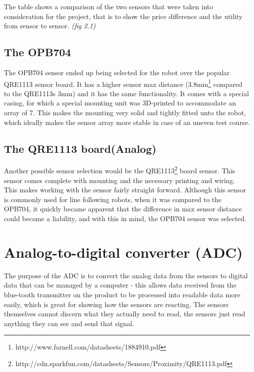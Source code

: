 The table shows a comparison of the two sensors that were taken into consideration for the project, that is to show the price difference and the utility from sensor to sensor. \emph{(fig 2.1)}



\subsection{The OPB704}

The OPB704 sensor ended up being selected for the robot over the popular QRE1113 sensor board. It has a higher sensor max distance (3.8mm\footnote{http://www.farnell.com/datasheets/1884910.pdf} compared to the QRE1113s 3mm) and it has the same functionality. It comes with a special casing, for which a special mounting unit was 3D-printed to accommodate an array of 7. This makes the mounting very solid and tightly fitted unto the robot, which ideally makes the sensor array more stable in case of an uneven test course.


\subsection{The QRE1113 board(Analog)}

Another possible sensor selection would be the QRE1113\footnote{http://cdn.sparkfun.com/datasheets/Sensors/Proximity/QRE1113.pdf} board sensor. This sensor comes complete with mounting and the necessary printing and wiring. This makes working with the sensor fairly straight forward. Although this sensor is commonly used for line following robots, when it was compared to the OPB704, it quickly became apparent that the difference in max sensor distance could become a liability, and with this in mind, the OPB704 sensor was selected.





\section{Analog-to-digital converter (ADC)}

The purpose of the ADC is to convert the analog data from the sensors to digital data that can be managed by a computer - this allows data received from the blue-tooth transmitter on the product to be processed into readable data more easily, which is great for showing how the sensors are reacting. The sensors themselves cannot discern what they actually need to read, the sensors just read anything they can see and send that signal.

